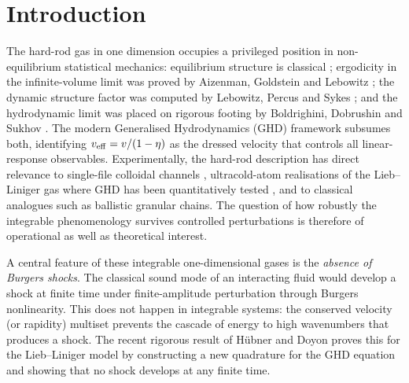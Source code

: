 \documentclass[aps,pre,twocolumn,superscriptaddress,longbibliography,floatfix]{revtex4-2}
\begin{document}
\maketitle

\section{Introduction}

The hard-rod gas in one dimension occupies a privileged position
in non-equilibrium statistical mechanics: equilibrium structure
is classical \cite{Tonks1936,SalsburgZwanzig1953,LiebMattis1966};
ergodicity in the infinite-volume limit was proved by Aizenman,
Goldstein and Lebowitz \cite{Aizenman1975}; the dynamic structure
factor was computed by Lebowitz, Percus and Sykes
\cite{Lebowitz1968}; and the hydrodynamic limit was placed on
rigorous footing by Boldrighini, Dobrushin and Sukhov
\cite{BDS1983}. The modern Generalised Hydrodynamics (GHD)
framework \cite{DoyonSpohn2017,Doyon2017Lectures,DenardisDoyon2018,
Bulchandani2018,GHDperspective2025} subsumes both, identifying
$v_{\rm eff}=v/(1-\eta)$ as the dressed velocity that controls
all linear-response observables. Experimentally, the hard-rod
description has direct relevance to single-file colloidal channels
\cite{Wei2000,LinCui2015}, ultracold-atom realisations of the
Lieb--Liniger gas where GHD has been quantitatively tested
\cite{Schemmer2019,Malvania2021,Cataldini2022}, and to
classical analogues such as ballistic granular chains. The
question of how robustly the integrable phenomenology survives
controlled perturbations is therefore of operational as well as
theoretical interest.

A central feature of these integrable one-dimensional gases is
the \emph{absence of Burgers shocks}. The classical sound mode
of an interacting fluid would develop a shock at finite time
under finite-amplitude perturbation through Burgers nonlinearity.
This does not happen in integrable systems: the conserved
velocity (or rapidity) multiset prevents the cascade of
energy to high wavenumbers that produces a shock. The recent
rigorous result of H\"ubner and Doyon \cite{HubnerDoyon2024}
proves this for the Lieb--Liniger model by constructing a new
quadrature for the GHD equation and showing that no shock
develops at any finite time.
\end{document}
